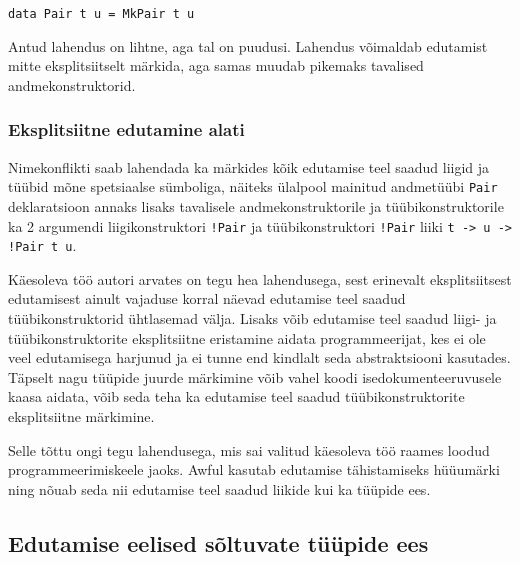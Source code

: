 \documentclass[12pt]{article}
\begin{document}
        \begin{verbatim}data Pair t u = MkPair t u\end{verbatim}

        Antud lahendus on lihtne, aga tal on puudusi. Lahendus võimaldab edutamist mitte eksplitsiitselt märkida, aga samas muudab pikemaks tavalised andmekonstruktorid.
      \subsubsection{Eksplitsiitne edutamine alati}
        Nimekonflikti saab lahendada ka märkides kõik edutamise teel saadud liigid ja tüübid mõne spetsiaalse sümboliga, näiteks ülalpool mainitud andmetüübi \verb!Pair! deklaratsioon annaks lisaks tavalisele andmekonstruktorile ja tüübikonstruktorile ka 2 argumendi liigikonstruktori \verb"!Pair" ja tüübikonstruktori \verb"!Pair" liiki \verb"t -> u -> !Pair t u".

        Käesoleva töö autori arvates on tegu hea lahendusega, sest erinevalt eksplitsiitsest edutamisest ainult vajaduse korral näevad edutamise teel saadud tüübikonstruktorid ühtlasemad välja. Lisaks võib edutamise teel saadud liigi- ja tüübikonstruktorite eksplitsiitne eristamine aidata programmeerijat, kes ei ole veel edutamisega harjunud ja ei tunne end kindlalt seda abstraktsiooni kasutades. Täpselt nagu tüüpide juurde märkimine võib vahel koodi isedokumenteeruvusele kaasa aidata, võib seda teha ka edutamise teel saadud tüübikonstruktorite eksplitsiitne märkimine.

        Selle tõttu ongi tegu lahendusega, mis sai valitud käesoleva töö raames loodud programmeerimiskeele jaoks. Awful kasutab edutamise tähistamiseks hüüumärki ning nõuab seda nii edutamise teel saadud liikide kui ka tüüpide ees.
    \subsection{Edutamise eelised sõltuvate tüüpide ees}
      
\end{document}
